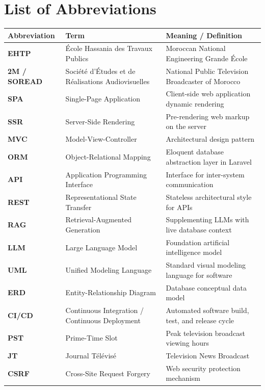 \documentclass[12pt,a4paper,oneside]{report}
\begin{document}
\newpage

\chapter*{List of Abbreviations}

\begin{table}[h!]
\centering
\begin{tabularx}{\textwidth}{llX}
\toprule
\textbf{Abbreviation} & \textbf{Term} & \textbf{Meaning / Definition} \\
\midrule
\textbf{EHTP} & École Hassania des Travaux Publics & Moroccan National Engineering Grande École \\
\textbf{2M / SOREAD} & Société d'Études et de Réalisations Audiovisuelles & National Public Television Broadcaster of Morocco \\
\textbf{SPA} & Single-Page Application & Client-side web application dynamic rendering \\
\textbf{SSR} & Server-Side Rendering & Pre-rendering web markup on the server \\
\textbf{MVC} & Model-View-Controller & Architectural design pattern \\
\textbf{ORM} & Object-Relational Mapping & Eloquent database abstraction layer in Laravel \\
\textbf{API} & Application Programming Interface & Interface for inter-system communication \\
\textbf{REST} & Representational State Transfer & Stateless architectural style for APIs \\
\textbf{RAG} & Retrieval-Augmented Generation & Supplementing LLMs with live database context \\
\textbf{LLM} & Large Language Model & Foundation artificial intelligence model \\
\textbf{UML} & Unified Modeling Language & Standard visual modeling language for software \\
\textbf{ERD} & Entity-Relationship Diagram & Database conceptual data model \\
\textbf{CI/CD} & Continuous Integration / Continuous Deployment & Automated software build, test, and release cycle \\
\textbf{PST} & Prime-Time Slot & Peak television broadcast viewing hours \\
\textbf{JT} & Journal Télévisé & Television News Broadcast \\
\textbf{CSRF} & Cross-Site Request Forgery & Web security protection mechanism \\
\bottomrule
\end{tabularx}
\end{table}
\end{document}
